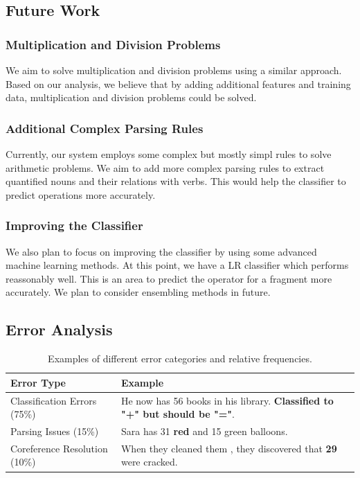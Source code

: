 \documentclass[11pt]{article}
\begin{document}
\subsection{Future Work}\label{sec:futurework}
\subsubsection{Multiplication and Division Problems}\label{sec:futureworkmanddproblems}
We aim to solve multiplication and division problems using a similar approach. Based on our analysis, we believe that by adding additional features and training data, multiplication and division problems could be solved.

\subsubsection{Additional Complex Parsing Rules}\label{sec:futureworkparsingrules}
Currently, our system employs some complex but mostly simpl rules to solve arithmetic problems. We aim to add more complex parsing rules to extract quantified nouns and their relations with verbs. This would help the classifier to predict operations more accurately. 

\subsubsection{Improving the Classifier}\label{sec:classifierimprovement}
We also plan to focus on improving the classifier by using some advanced machine learning methods. At this point, we have a LR classifier which performs reassonably well. This is an area to predict the operator for a fragment more accurately. We plan to consider ensembling methods in future.

\subsection{Error Analysis}\label{sec:erroranalysis}
\begin{table}[h!]
\begin{center}
\begin{tabular}{|>{\centering\arraybackslash}m{8em}|>{\centering\arraybackslash}m{20em}|}
\hline
\bf Error Type & \bf Example \\
\hline
Classification Errors (75\%) & He now has 56 books in his library. \textbf{Classified to "+" but should be "="}. \\
\hline
Parsing Issues (15\%) & Sara has 31 \textbf{red} and 15 green balloons. \\
\hline
Coreference Resolution (10\%) & When they cleaned them , they discovered that \textbf{29} were cracked. \\
\hline
\end{tabular}
\caption{Examples of different error categories and relative frequencies.}
\label{figure:25}
\end{center}
\end{table}
\end{document}

